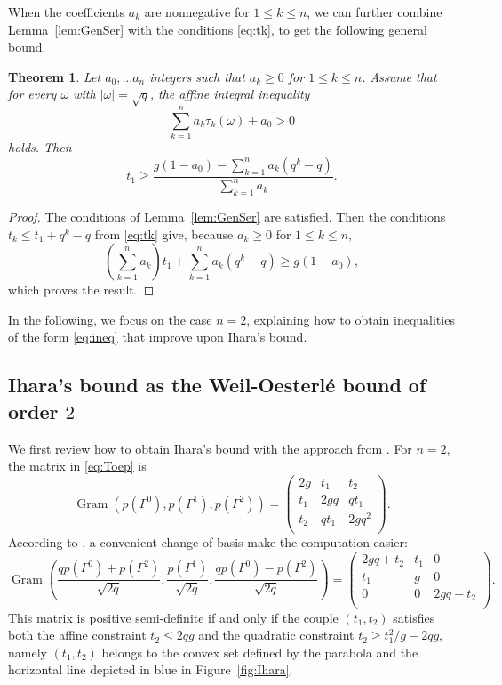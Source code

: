 \documentclass{amsart}
\newtheorem{theorem}[defin]{Theorem}
\DeclareMathOperator{\Gram}{Gram}
\begin{document}
When the coefficients $a_k$ are nonnegative for $1\leq k \leq n$, we can further combine Lemma~\ref{lem:GenSer} with the conditions \eqref{eq:tk}, to get the following general bound.


\begin{theorem}\label{thm:GenBound}
Let $a_0, \ldots a_n$ integers such that $a_k\geq 0$ for $1 \leq k \leq n$. 
Assume that for every $\omega$ with $\left| \omega \right| = \sqrt{q}$, the affine integral inequality
\begin{equation}\label{eq:integineq}
\sum_{k=1}^n a_k\tau_k(\omega) + a_0> 0
\end{equation}
holds.
Then 
\begin{equation}
t_1 \geq  \frac{g(1-a_0)-\sum_{k=1}^n a_k(q^k-q)}{\sum_{k=1}^n a_k}.
\end{equation}
\end{theorem}
\begin{proof}
The conditions of Lemma~\ref{lem:GenSer} are satisfied.
Then the conditions  $t_k \leq t_1 + q^k -q$ from \eqref{eq:tk} give, because $a_k \geq 0$ for $1\leq k \leq n$,
\[
\left(\sum_{k=1}^n a_k\right)t_1 + \sum_{k=1}^n a_k(q^k-q) \geq g(1-a_0), 
\]
which proves the result.
\end{proof}

In the following, we focus on the case $n=2$, explaining how to obtain inequalities of the form \eqref{eq:ineq} that improve upon Ihara's bound.

\subsection{Ihara's bound as the Weil-Oesterl\'e bound of order $2$}
We first review how to obtain Ihara's bound with the approach from \cite{HP19}.
For $n=2$, the matrix in \eqref{eq:Toep} is 
\[
\Gram\left(p(\Gamma^0),p(\Gamma^1),p(\Gamma^2)\right)
=
\begin{pmatrix}
2g & t_1 & t_2  \\
t_1 & 2gq & qt_1  \\
t_2 & qt_1 & 2gq^2  \\
\end{pmatrix}.
\]
According to \cite{HP19}, a convenient change of basis make the computation easier:
\begin{equation}\label{eq:blocks}
\Gram\left(
\frac{q p(\Gamma^0) + p(\Gamma^2)}{\sqrt{2q}},
\frac{p(\Gamma^1)}{\sqrt{2q}},
\frac{q p(\Gamma^0) - p(\Gamma^2)}{\sqrt{2q}}
\right)
=
\begin{pmatrix}
2gq+t_2 & t_1 & 0  \\
t_1 & g & 0  \\
0 & 0 & 2gq-t_2  \\
\end{pmatrix}.
\end{equation}
This matrix is positive semi-definite if and only if the couple $(t_1,t_2)$ satisfies both the affine constraint $t_2 \leq 2qg$ and the quadratic constraint $t_2 \geq t_1^2/g - 2qg$, namely $(t_1,t_2)$ belongs to the convex set defined by the parabola and the horizontal line depicted in blue in Figure~\ref{fig:Ihara}. 
\end{document}
